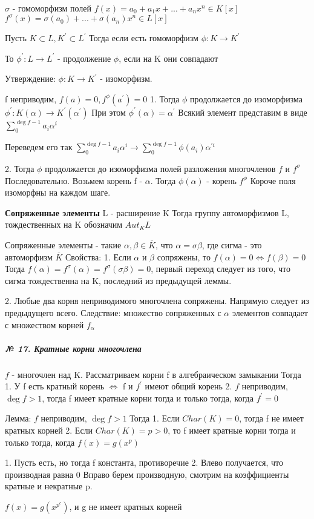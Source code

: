 \documentclass{article}
\begin{document}
\begin{flushleft}
$\sigma$ - гомоморфизм полей
$f(x) = a_0 + a_1x + ... + a_nx^n \in K[x]$
$f^\sigma(x) = \sigma(a_0) + ... + \sigma(a_n)x^n \in L[x]$

Пусть $K \subset L, K^\prime \subset L^\prime$
Тогда если есть гомоморфизм $\phi: K \rightarrow K^\prime$

То $\phi^\prime : L \rightarrow L^\prime$ - продолжение $\phi$, если на K они совпадают 

Утверждение:
$\phi: K \rightarrow K^\prime$ - изоморфизм.

f неприводим, $f(a) = 0, f^\phi(a^\prime) = 0$
1. Тогда $\phi$ продолжается до изоморфизма $\phi^\prime : K(\alpha) \rightarrow K^\prime(\alpha^\prime)$
При этом $\phi^\prime(\alpha) = \alpha^\prime$
Всякий элемент представим в виде $\sum\limits_0^{\deg{f} - 1}{a_i\alpha^i}$

Переведем его так $\sum\limits_0^{\deg{f} - 1}{a_i\alpha^i} \rightarrow \sum\limits_0^{\deg{f} - 1}{\phi(a_i)\alpha^{\prime i}}$

2. Тогда $\phi$ продолжается до изоморфизма полей разложения многочленов $f$ и $f^\sigma$
Последовательно. Возьмем корень f - $\alpha$. Тогда $\phi(\alpha)$ - корень $f^\phi$
Короче поля изоморфны на каждом шаге.

\textbf{Сопряженные элементы}
L - расширение K
Тогда группу автоморфизмов L, тождественных на K обозначим $Aut_KL$

Сопряженные элементы - такие $\alpha, \beta \in \overline{K}$, что $\alpha = \sigma \beta$, где сигма - это автоморфизм $\overline{K}$
Свойства:
1. Если $\alpha$ и $\beta$ сопряжены, то $f(\alpha) = 0 \Leftrightarrow f(\beta) = 0$
Тогда $f(\alpha) = f^\sigma(\alpha) = f^\sigma(\sigma \beta) = 0$, первый переход следует из того, что сигма тождественна на K, последний из предыдущей леммы.

2. Любые два корня неприводимого многочлена сопряжены.
Напрямую следует из предыдущего всего.
Следствие: множество сопряженных с $\alpha$ элементов совпадает с множеством корней $f_\alpha$

\subparagraph{\tiny № 17. Кратные корни многочлена}

$f$ - многочлен над K.
Рассматриваем корни f в алгебраическом замыкании
Тогда
1. У f есть кратный корень $\Leftrightarrow$ f и $f^\prime$ имеют общий корень
2. $f$ неприводим, $\deg{f} > 1$, тогда f имеет кратные корни тогда и только тогда, когда $f^\prime = 0$

Лемма:
$f$ неприводим, $\deg{f} > 1$
Тогда
1. Если $Char(K) = 0$, тогда f не имеет кратных корней
2. Если $Char(K) = p > 0$, то f имеет кратные корни тогда и только тогда, когда $f(x) = g(x^p)$

1. Пусть есть, но тогда f константа,  противоречие
2. Влево получается, что производная равна 0
Вправо берем производную, смотрим на коэффициенты кратные и некратные p.

$f(x) = g(x^{p^c})$, и g не имеет кратных корней


\end{flushleft}
\end{document}
